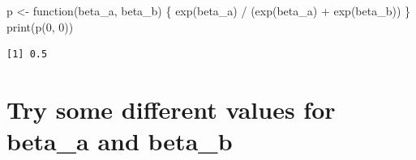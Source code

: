 \documentclass[
  letterpaper,
  DIV=11,
  numbers=noendperiod]{scrreprt}
\newenvironment{Shaded}{\begin{snugshade}}{\end{snugshade}}
\newcommand{\ControlFlowTok}[1]{\textcolor[rgb]{0.00,0.23,0.31}{#1}}
\newcommand{\DecValTok}[1]{\textcolor[rgb]{0.68,0.00,0.00}{#1}}
\newcommand{\FunctionTok}[1]{\textcolor[rgb]{0.28,0.35,0.67}{#1}}
\newcommand{\NormalTok}[1]{\textcolor[rgb]{0.00,0.23,0.31}{#1}}
\newcommand{\OtherTok}[1]{\textcolor[rgb]{0.00,0.23,0.31}{#1}}
\newcommand{\SpecialCharTok}[1]{\textcolor[rgb]{0.37,0.37,0.37}{#1}}
\begin{document}
\begin{Shaded}
\begin{Highlighting}[]
\NormalTok{p }\OtherTok{\textless{}{-}} \ControlFlowTok{function}\NormalTok{(beta\_a, beta\_b) \{}
  \FunctionTok{exp}\NormalTok{(beta\_a) }\SpecialCharTok{/}\NormalTok{ (}\FunctionTok{exp}\NormalTok{(beta\_a) }\SpecialCharTok{+} \FunctionTok{exp}\NormalTok{(beta\_b))}
\NormalTok{\}}
\FunctionTok{print}\NormalTok{(}\FunctionTok{p}\NormalTok{(}\DecValTok{0}\NormalTok{, }\DecValTok{0}\NormalTok{))}
\end{Highlighting}
\end{Shaded}

\begin{verbatim}
[1] 0.5
\end{verbatim}

\hypertarget{try-some-different-values-for-beta_a-and-beta_b}{%
\section{Try some different values for beta\_a and
beta\_b}\label{try-some-different-values-for-beta_a-and-beta_b}}
\end{document}
